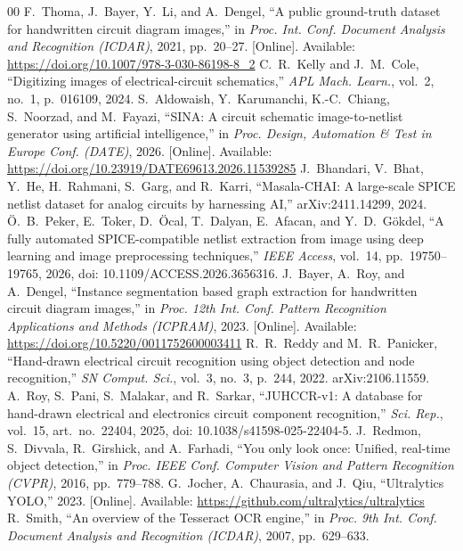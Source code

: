 \documentclass{ieeeaccess}
\begin{document}
\begin{thebibliography}{00}
 F.~Thoma, J.~Bayer, Y.~Li, and A.~Dengel, ``A public ground-truth dataset for handwritten circuit diagram images,'' in \textit{Proc. Int. Conf. Document Analysis and Recognition (ICDAR)}, 2021, pp.~20--27. [Online]. Available: \url{https://doi.org/10.1007/978-3-030-86198-8_2}
 C.~R.~Kelly and J.~M.~Cole, ``Digitizing images of electrical-circuit schematics,'' \textit{APL Mach. Learn.}, vol.~2, no.~1, p.~016109, 2024.
 S.~Aldowaish, Y.~Karumanchi, K.-C.~Chiang, S.~Noorzad, and M.~Fayazi, ``SINA: A circuit schematic image-to-netlist generator using artificial intelligence,'' in \textit{Proc. Design, Automation \& Test in Europe Conf. (DATE)}, 2026. [Online]. Available: \url{https://doi.org/10.23919/DATE69613.2026.11539285}
 J.~Bhandari, V.~Bhat, Y.~He, H.~Rahmani, S.~Garg, and R.~Karri, ``Masala-CHAI: A large-scale SPICE netlist dataset for analog circuits by harnessing AI,'' arXiv:2411.14299, 2024.
 \"{O}.~B.~Peker, E.~Toker, D.~\"{O}cal, T.~Dalyan, E.~Afacan, and Y.~D.~G\"{o}kdel, ``A fully automated SPICE-compatible netlist extraction from image using deep learning and image preprocessing techniques,'' \textit{IEEE Access}, vol.~14, pp.~19750--19765, 2026, doi: 10.1109/ACCESS.2026.3656316.
 J.~Bayer, A.~Roy, and A.~Dengel, ``Instance segmentation based graph extraction for handwritten circuit diagram images,'' in \textit{Proc. 12th Int. Conf. Pattern Recognition Applications and Methods (ICPRAM)}, 2023. [Online]. Available: \url{https://doi.org/10.5220/0011752600003411}
 R.~R.~Reddy and M.~R.~Panicker, ``Hand-drawn electrical circuit recognition using object detection and node recognition,'' \textit{SN Comput. Sci.}, vol.~3, no.~3, p.~244, 2022. arXiv:2106.11559.
 A.~Roy, S.~Pani, S.~Malakar, and R.~Sarkar, ``JUHCCR-v1: A database for hand-drawn electrical and electronics circuit component recognition,'' \textit{Sci. Rep.}, vol.~15, art.~no.~22404, 2025, doi: 10.1038/s41598-025-22404-5.
 J.~Redmon, S.~Divvala, R.~Girshick, and A.~Farhadi, ``You only look once: Unified, real-time object detection,'' in \textit{Proc. IEEE Conf. Computer Vision and Pattern Recognition (CVPR)}, 2016, pp.~779--788.
 G.~Jocher, A.~Chaurasia, and J.~Qiu, ``Ultralytics YOLO,'' 2023. [Online]. Available: \url{https://github.com/ultralytics/ultralytics}
 R.~Smith, ``An overview of the Tesseract OCR engine,'' in \textit{Proc. 9th Int. Conf. Document Analysis and Recognition (ICDAR)}, 2007, pp.~629--633.

\end{thebibliography}
\end{document}
